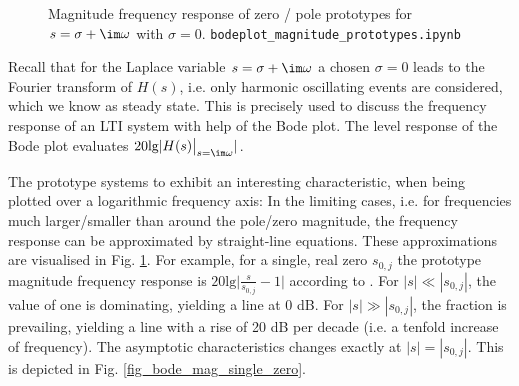 \begin{figure}[!ht]
\caption{Magnitude frequency response of zero / pole prototypes for $s = \sigma + \im \omega$ with $\sigma=0$.
\texttt{bodeplot\_magnitude\_prototypes.ipynb}}
\label{fig:magbodeprototype}
\end{figure}

Recall that for the Laplace variable $s=\sigma + \im\omega$ a chosen  $\sigma=0$
leads to the Fourier transform of $H(s)$, i.e. only harmonic oscillating events
are considered, which we know as steady state.
This is precisely used to discuss the frequency response of an LTI system with
help of the Bode plot.
The level response of the Bode plot evaluates $20 \text{lg} |H(s)\big|_{s=\im \omega}|$.

The prototype systems  to
 exhibit an interesting characteristic,
when being plotted over a logarithmic frequency axis:
In the limiting cases, i.e. for frequencies much larger/smaller than around the pole/zero magnitude, the frequency response can be approximated by straight-line equations.
These approximations are visualised in Fig. \ref{fig:magbodeprototype}.
For example, for a single, real zero $s_{0,j}$ the prototype magnitude frequency response is $20 \text{lg}  \bigg|\frac{s}{s_{0,j}}-1\bigg|$
according to .
For $|s| \ll |s_{0,j}|$, the value of one is dominating, yielding a line at 0 dB.
For $|s| \gg |s_{0,j}|$, the fraction is prevailing, yielding a line with a rise of 20 dB per decade (i.e. a tenfold increase of frequency).
The asymptotic characteristics changes exactly at $|s| = |s_{0,j}|$.
This is depicted in Fig. \ref{fig_bode_mag_single_zero}.



